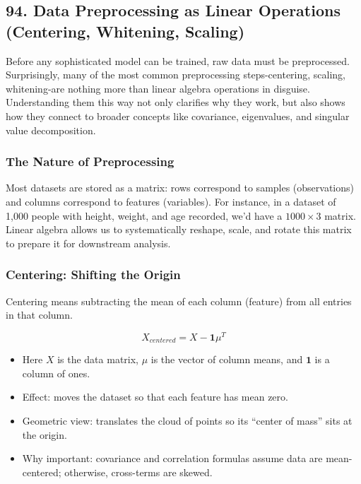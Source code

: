 \documentclass[
  letterpaper,
  DIV=11,
  numbers=noendperiod]{scrreprt}
\providecommand{\tightlist}{%
  \setlength{\itemsep}{0pt}\setlength{\parskip}{0pt}}
\begin{document}
\subsection{94. Data Preprocessing as Linear Operations (Centering,
Whitening,
Scaling)}\label{data-preprocessing-as-linear-operations-centering-whitening-scaling}

Before any sophisticated model can be trained, raw data must be
preprocessed. Surprisingly, many of the most common preprocessing
steps-centering, scaling, whitening-are nothing more than linear algebra
operations in disguise. Understanding them this way not only clarifies
why they work, but also shows how they connect to broader concepts like
covariance, eigenvalues, and singular value decomposition.

\subsubsection{The Nature of
Preprocessing}\label{the-nature-of-preprocessing}

Most datasets are stored as a matrix: rows correspond to samples
(observations) and columns correspond to features (variables). For
instance, in a dataset of 1,000 people with height, weight, and age
recorded, we'd have a \(1000 \times 3\) matrix. Linear algebra allows us
to systematically reshape, scale, and rotate this matrix to prepare it
for downstream analysis.

\subsubsection{Centering: Shifting the
Origin}\label{centering-shifting-the-origin}

Centering means subtracting the mean of each column (feature) from all
entries in that column.

\[
X_{centered} = X - \mathbf{1}\mu^T
\]

\begin{itemize}
\tightlist
\item
  Here \(X\) is the data matrix, \(\mu\) is the vector of column means,
  and \(\mathbf{1}\) is a column of ones.
\item
  Effect: moves the dataset so that each feature has mean zero.
\item
  Geometric view: translates the cloud of points so its ``center of
  mass'' sits at the origin.
\item
  Why important: covariance and correlation formulas assume data are
  mean-centered; otherwise, cross-terms are skewed.
\end{itemize}
\end{document}
